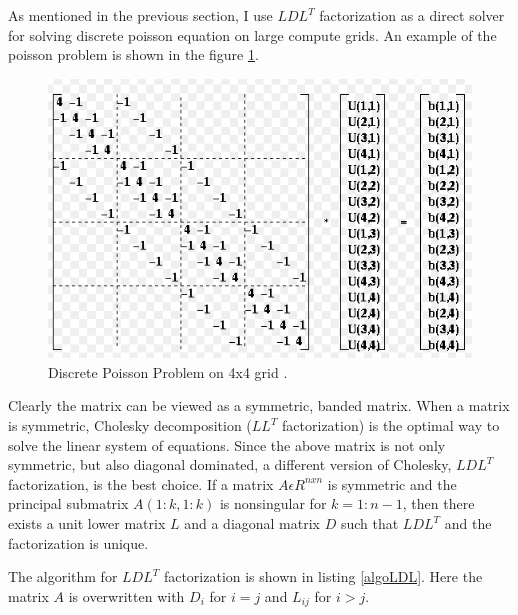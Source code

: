 \documentclass{article}
\begin{document}
\begin{spacing}{1.1}
As mentioned in the previous section, I use $LDL^T$ factorization as a direct solver for solving discrete poisson equation on large compute grids. An example of the poisson problem is shown in the figure \ref{poisson}.

\begin{center}
	\begin{figure}[H]
	\centering
       \includegraphics[scale=.40]{poisson.png}
        \caption{\label{poisson} Discrete Poisson Problem on 4x4 grid \cite{Berkley1996}.} 
	\end{figure}
\end{center}

Clearly the matrix can be viewed as a symmetric, banded matrix. When a matrix is symmetric, Cholesky decomposition ($LL^T$ factorization) is the optimal way to solve the linear system of equations. Since the above matrix is not only symmetric, but also diagonal dominated, a different version of Cholesky, $LDL^T$ factorization, is the best choice. 
If a matrix $A\epsilon R^{nxn}$ is symmetric and the principal submatrix $A(1:k,1:k)$ is nonsingular for $k=1:n-1$, then there exists a unit lower matrix $L$ and a diagonal matrix $D$ such that $LDL^T$ and the factorization is unique. \cite{MatComp}

The algorithm for $LDL^T$ factorization is shown in listing \eqref{algoLDL}. Here the matrix $A$ is overwritten with $D_i$ for $i=j$ and $L_{ij}$ for $i>j$.
\begin{algorithm}[H]

\begin{algorithmic}[1]


\end{algorithmic}
\end{algorithm}
\end{spacing}
\end{document}
